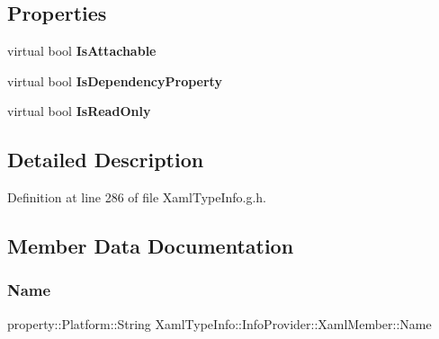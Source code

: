 \subsection*{Properties}
\begin{DoxyCompactItemize}
\item 
\mbox{\label{class_xaml_type_info_1_1_info_provider_1_1_xaml_member_acc8de4765b09acd4b6b8d2083adf501c}} 
virtual bool {\bfseries Is\+Attachable}
\item 
\mbox{\label{class_xaml_type_info_1_1_info_provider_1_1_xaml_member_af1850c11a8e6df045cc88196df6d85e3}} 
virtual bool {\bfseries Is\+Dependency\+Property}
\item 
\mbox{\label{class_xaml_type_info_1_1_info_provider_1_1_xaml_member_a66b48fe9e8c22fe2e31b0dc3b102ef06}} 
virtual bool {\bfseries Is\+Read\+Only}
\end{DoxyCompactItemize}


\subsection{Detailed Description}


Definition at line 286 of file Xaml\+Type\+Info.\+g.\+h.



\subsection{Member Data Documentation}
\mbox{\label{class_xaml_type_info_1_1_info_provider_1_1_xaml_member_a49ef07a113cfa90692716b5b110038f3}} 
\subsubsection{\texorpdfstring{Name}{Name}}
{\footnotesize\ttfamily property\+::\+Platform\+::\+String Xaml\+Type\+Info\+::\+Info\+Provider\+::\+Xaml\+Member\+::\+Name}

